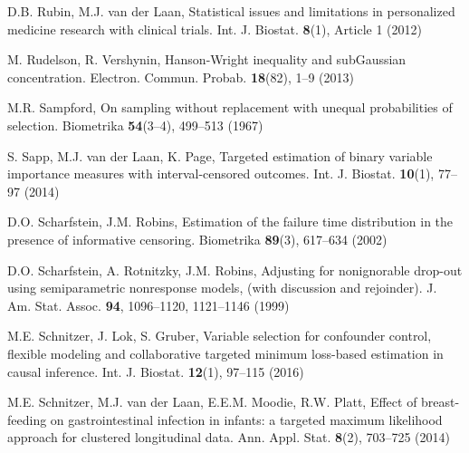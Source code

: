 \begin{list}{}{\setlength{\leftmargin}{2.1em}\setlength{\labelwidth}{0pt}
  \setlength{\labelsep}{0pt}\setlength{\itemindent}{-2.1em}
  \setlength{\parsep}{0pt}\setlength{\itemsep}{2pt}\setlength{\topsep}{0pt}}
\item\label{refentry:REF344}D.B. Rubin, M.J. van der Laan, Statistical issues and limitations in personalized medicine research with clinical trials. Int. J. Biostat. \textbf{8}(1), Article 1 (2012)\label{refend:REF344}
\item\label{refentry:REF345}M. Rudelson, R. Vershynin, Hanson-Wright inequality and subGaussian concentration. Electron. Commun. Probab. \textbf{18}(82), 1--9 (2013)\label{refend:REF345}
\item\label{refentry:REF346}M.R. Sampford, On sampling without replacement with unequal probabilities of selection. Biometrika \textbf{54}(3--4), 499--513 (1967)\label{refend:REF346}
\item\label{refentry:REF347}S. Sapp, M.J. van der Laan, K. Page, Targeted estimation of binary variable importance measures with interval-censored outcomes. Int. J. Biostat. \textbf{10}(1), 77--97 (2014)\label{refend:REF347}
\item\label{refentry:REF348}D.O. Scharfstein, J.M. Robins, Estimation of the failure time distribution in the presence of informative censoring. Biometrika \textbf{89}(3), 617--634 (2002)\label{refend:REF348}
\item\label{refentry:REF349}D.O. Scharfstein, A. Rotnitzky, J.M. Robins, Adjusting for nonignorable drop-out using semiparametric nonresponse models, (with discussion and rejoinder). J. Am. Stat. Assoc. \textbf{94}, 1096--1120, 1121--1146 (1999)\label{refend:REF349}
\item\label{refentry:REF350}M.E. Schnitzer, J. Lok, S. Gruber, Variable selection for confounder control, flexible modeling and collaborative targeted minimum loss-based estimation in causal inference. Int. J. Biostat. \textbf{12}(1), 97--115 (2016)\label{refend:REF350}
\item\label{refentry:REF351}M.E. Schnitzer, M.J. van der Laan, E.E.M. Moodie, R.W. Platt, Effect of breast-feeding on gastrointestinal infection in infants: a targeted maximum likelihood approach for clustered longitudinal data. Ann. Appl. Stat. \textbf{8}(2), 703--725 (2014)\label{refend:REF351}

\end{list}
